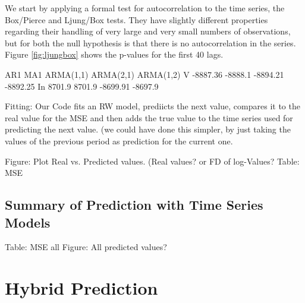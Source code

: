 We start by applying a formal test for autocorrelation to the time series, the Box/Pierce and Ljung/Box tests. They have slightly different properties regarding their handling of very large and very small numbers of observations, but for both the null hypothesis is that there is no autocorrelation in the series. Figure \ref{fig:ljungbox} shows the p-values for the first 40 lags. 


\begin{figure}[h]
    \centering
    \begin{adjustbox}{width=.95\textwidth,center}
    
    \end{adjustbox}
    \begin{adjustbox}{width=.95\textwidth,center}
    
    \end{adjustbox} 
    \caption{}
    \label{fig:INTC_V_ACF_log_returns}
\end{figure}{}

    AR1         MA1         ARMA(1,1)   ARMA(2,1)   ARMA(1,2)     
V   -8887.36    -8888.1     -8894.21    -8892.25 
In  8701.9      8701.9      -8699.91    -8697.9


Fitting: 
Our Code fits an RW model, prediicts the next value, compares it to the real value for the MSE and then adds the true value to the time series used for predicting the next value. (we could have done this simpler, by just taking the values of the previous period as prediction for the current one. 

Figure: Plot Real vs. Predicted values. (Real values? or FD of log-Values?
Table: MSE





\subsection{Summary of Prediction with Time Series Models}
Table: MSE all
Figure: All predicted values?


\section{Hybrid Prediction}

